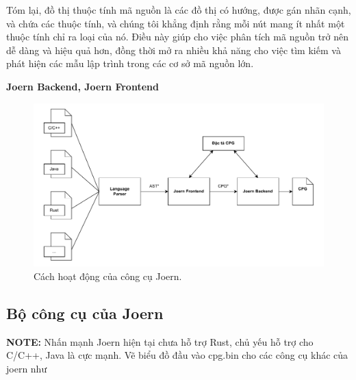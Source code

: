 Tóm lại, đồ thị thuộc tính mã nguồn là các đồ thị có hướng, được gán nhãn cạnh, và chứa các thuộc tính, và chúng tôi khẳng định rằng mỗi nút mang ít nhất một thuộc tính chỉ ra loại của nó.
Điều này giúp cho việc phân tích mã nguồn trở nên dễ dàng và hiệu quả hơn, đồng thời mở ra nhiều khả năng cho việc tìm kiếm và phát hiện các mẫu lập trình trong các cơ sở mã nguồn lớn.

\textbf{Joern Backend, Joern Frontend}

\begin{figure}[H]
  \includegraphics[width=1\columnwidth]{figures/c2/c2_frontend_backend.drawio.pdf}
  \centering
  \caption{Cách hoạt động của công cụ Joern.}
  \label{img:c2_frontend_backend}
\end{figure}

\subsection{Bộ công cụ của Joern}

\textbf{NOTE:} Nhấn mạnh Joern hiện tại chưa hỗ trợ Rust, chủ yếu hỗ trợ cho C/C++, Java là cực mạnh.
Vẽ biểu đồ đầu vào cpg.bin cho các công cụ khác của joern như


